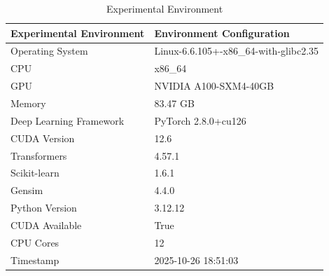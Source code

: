 \begin{table}
\caption{Experimental Environment}
\label{tab:env}
\begin{tabular}{ll}
\toprule
Experimental Environment & Environment Configuration \\
\midrule
Operating System & Linux-6.6.105+-x86_64-with-glibc2.35 \\
CPU & x86_64 \\
GPU & NVIDIA A100-SXM4-40GB \\
Memory & 83.47 GB \\
Deep Learning Framework & PyTorch 2.8.0+cu126 \\
CUDA Version & 12.6 \\
Transformers & 4.57.1 \\
Scikit-learn & 1.6.1 \\
Gensim & 4.4.0 \\
Python Version & 3.12.12 \\
CUDA Available & True \\
CPU Cores & 12 \\
Timestamp & 2025-10-26 18:51:03 \\
\bottomrule
\end{tabular}
\end{table}
